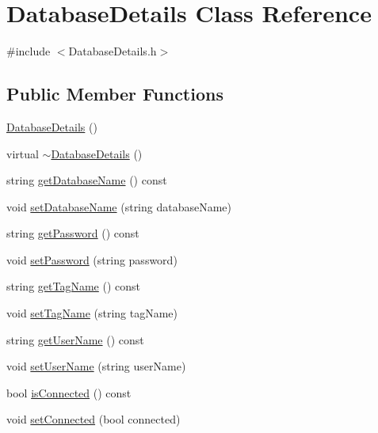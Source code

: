 \hypertarget{classDatabaseDetails}{}\section{Database\+Details Class Reference}
\label{classDatabaseDetails}


{\ttfamily \#include $<$Database\+Details.\+h$>$}

\subsection*{Public Member Functions}
\begin{DoxyCompactItemize}
\item 
\hyperlink{classDatabaseDetails_acabeafc7ed16f5a2157848bad8e9e7aa}{Database\+Details} ()
\item 
virtual \hyperlink{classDatabaseDetails_a869768858f75283b579dd5c62b05ce71}{$\sim$\+Database\+Details} ()
\item 
string \hyperlink{classDatabaseDetails_aa14ce03e41c3bb2c78f2d455b7423436}{get\+Database\+Name} () const 
\item 
void \hyperlink{classDatabaseDetails_ad5a8adc1d2e84c83aa0860cd63911393}{set\+Database\+Name} (string database\+Name)
\item 
string \hyperlink{classDatabaseDetails_aff9d9a580f67e985b0dee76b697fa57c}{get\+Password} () const 
\item 
void \hyperlink{classDatabaseDetails_a61b082a9006613de2453bfab67f1af9e}{set\+Password} (string password)
\item 
string \hyperlink{classDatabaseDetails_a3bc6aa0cab0547109277e5e6179fe24c}{get\+Tag\+Name} () const 
\item 
void \hyperlink{classDatabaseDetails_afadd6c964135607f0daaeae2cec64497}{set\+Tag\+Name} (string tag\+Name)
\item 
string \hyperlink{classDatabaseDetails_ad8153b502d603be68b389a0aca7d2b15}{get\+User\+Name} () const 
\item 
void \hyperlink{classDatabaseDetails_a2070515ac65842cbfe50d8e7423f6952}{set\+User\+Name} (string user\+Name)
\item 
bool \hyperlink{classDatabaseDetails_a1d16c8e4021ac65b09e3cd51d12b1f36}{is\+Connected} () const 
\item 
void \hyperlink{classDatabaseDetails_a59395315dd39566ecef24b99e9232ce0}{set\+Connected} (bool connected)
\end{DoxyCompactItemize}


